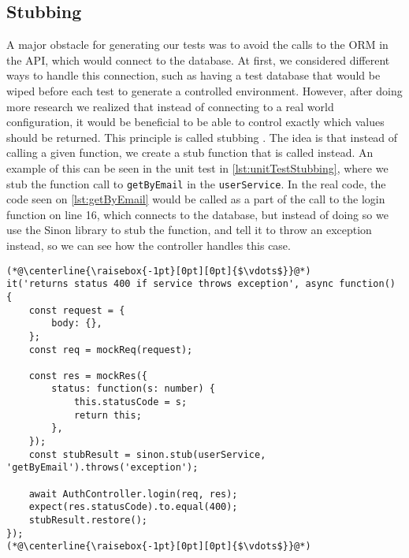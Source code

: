 \subsection{Stubbing}
A major obstacle for generating our tests was to avoid the calls to the ORM in the API, which would connect to the database.
At first, we considered different ways to handle this connection, such as having a test database that would be wiped before each test to generate a controlled environment.
However, after doing more research we realized that instead of connecting to a real world configuration, it would be beneficial to be able to control exactly which values should be returned.
This principle is called stubbing \cite{SoftwareTesting}.
The idea is that instead of calling a given function, we create a stub function that is called instead.
An example of this can be seen in the unit test in \autoref{lst:unitTestStubbing}, where we stub the function call to \texttt{getByEmail} in the \texttt{userService}.
In the real code, the code seen on \autoref{lst:getByEmail} would be called as a part of the call to the login function on line 16, which connects to the database, but instead of doing so we use the Sinon library to stub the function, and tell it to throw an exception instead, so we can see how the controller handles this case.

\begin{lstlisting}[caption={Unit test with stubbing},label={lst:unitTestStubbing}]
(*@\centerline{\raisebox{-1pt}[0pt][0pt]{$\vdots$}}@*)
it('returns status 400 if service throws exception', async function() {
    const request = {
        body: {},
    };
    const req = mockReq(request);

    const res = mockRes({
        status: function(s: number) {
            this.statusCode = s;
            return this;
        },
    });
    const stubResult = sinon.stub(userService, 'getByEmail').throws('exception');

    await AuthController.login(req, res);
    expect(res.statusCode).to.equal(400);
    stubResult.restore();
});
(*@\centerline{\raisebox{-1pt}[0pt][0pt]{$\vdots$}}@*)
\end{lstlisting}

